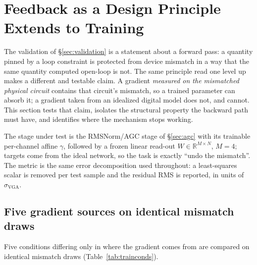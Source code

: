 \documentclass[11pt]{article}
\begin{document}
\section{Feedback as a Design Principle Extends to Training}
\label{sec:training}

The validation of \S\ref{sec:validation} is a statement about a forward pass: a quantity pinned by a loop constraint is protected from device mismatch in a way that the same quantity computed open-loop is not. The same principle read one level up makes a different and testable claim. A gradient \textit{measured on the mismatched physical circuit} contains that circuit's mismatch, so a trained parameter can absorb it; a gradient taken from an idealized digital model does not, and cannot. This section tests that claim, isolates the structural property the backward path must have, and identifies where the mechanism stops working.

The stage under test is the RMSNorm/AGC stage of \S\ref{sec:agc} with its trainable per-channel affine $\gamma$, followed by a frozen linear read-out $W \in \mathbb{R}^{M\times N}$, $M=4$; targets come from the ideal network, so the task is exactly ``undo the mismatch''. The metric is the same error decomposition used throughout: a least-squares scalar is removed per test sample and the residual RMS is reported, in units of $\sigma_{\mathrm{VGA}}$.

\subsection{Five gradient sources on identical mismatch draws}

Five conditions differing only in where the gradient comes from are compared on identical mismatch draws (Table~\ref{tab:trainconds}).
\end{document}
